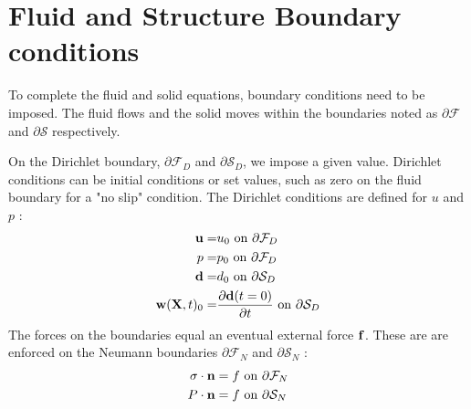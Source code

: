 \section{Fluid and Structure Boundary conditions}
To complete the fluid and solid equations, boundary conditions need to be imposed. The fluid flows and the solid moves within the boundaries noted as $ \partial\mathcal{F}$ and $ \partial \mathcal{S}$ respectively. 

On the Dirichlet boundary, $ \partial \mathcal{F}_D$ and $ \partial \mathcal{S}_D$, we impose a given value. Dirichlet conditions can be initial conditions or set values, such as zero on the fluid boundary for a "no slip" condition. The Dirichlet conditions are defined for $u$ and $p$ :
\begin{align}
\bold{u} =& u_0 \text{   on   } \partial \mathcal{F}_D  \\
p =& p_0 \text{   on   } \partial \mathcal{F}_D  \\
\bold{d} =& d_0 \text{ on   } \partial \mathcal{S}_D  \\
\bold{w}(\textbf{X},t)_0 =& \frac{\partial \bold{d}(t=0)}{\partial t} \text{   on   } \partial \mathcal{S}_D   
\end{align}
The forces on the boundaries equal an eventual external force $ \bold{f}$. These are are enforced on the Neumann boundaries $\partial \mathcal{F}_N$ and  $\partial \mathcal{S}_N$ :
\begin{align}
\sigma \cdot \bold{n} &= f \text{   on   } \partial \mathcal{F}_N \\   
P\cdot \bold{n} &= f \text{   on   } \partial \mathcal{S}_N    
\end{align}
